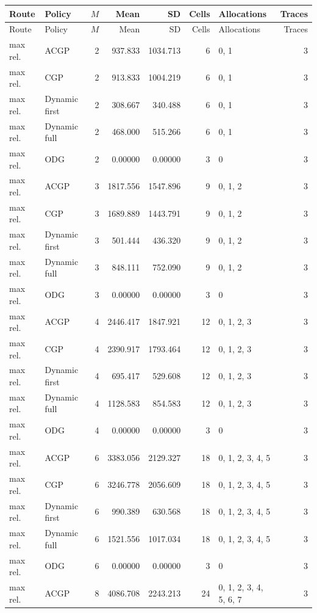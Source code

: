 \documentclass[10pt,a4paper]{article}
\begin{document}
\tiny\setlength{\tabcolsep}{2pt}\begin{longtable}{@{}p{23mm}p{29mm}rrrrp{36mm}r@{}}
\toprule Route & Policy & $M$ & Mean & SD & Cells & Allocations & Traces \\ \midrule\endfirsthead
\toprule Route & Policy & $M$ & Mean & SD & Cells & Allocations & Traces \\ \midrule\endhead
\bottomrule\endfoot
max rel. & ACGP & 2 & 937.833 & 1034.713 & 6 & 0, 1 & 3 \\
max rel. & CGP & 2 & 913.833 & 1004.219 & 6 & 0, 1 & 3 \\
max rel. & Dynamic first & 2 & 308.667 & 340.488 & 6 & 0, 1 & 3 \\
max rel. & Dynamic full & 2 & 468.000 & 515.266 & 6 & 0, 1 & 3 \\
max rel. & ODG & 2 & 0.00000 & 0.00000 & 3 & 0 & 3 \\
max rel. & ACGP & 3 & 1817.556 & 1547.896 & 9 & 0, 1, 2 & 3 \\
max rel. & CGP & 3 & 1689.889 & 1443.791 & 9 & 0, 1, 2 & 3 \\
max rel. & Dynamic first & 3 & 501.444 & 436.320 & 9 & 0, 1, 2 & 3 \\
max rel. & Dynamic full & 3 & 848.111 & 752.090 & 9 & 0, 1, 2 & 3 \\
max rel. & ODG & 3 & 0.00000 & 0.00000 & 3 & 0 & 3 \\
max rel. & ACGP & 4 & 2446.417 & 1847.921 & 12 & 0, 1, 2, 3 & 3 \\
max rel. & CGP & 4 & 2390.917 & 1793.464 & 12 & 0, 1, 2, 3 & 3 \\
max rel. & Dynamic first & 4 & 695.417 & 529.608 & 12 & 0, 1, 2, 3 & 3 \\
max rel. & Dynamic full & 4 & 1128.583 & 854.583 & 12 & 0, 1, 2, 3 & 3 \\
max rel. & ODG & 4 & 0.00000 & 0.00000 & 3 & 0 & 3 \\
max rel. & ACGP & 6 & 3383.056 & 2129.327 & 18 & 0, 1, 2, 3, 4, 5 & 3 \\
max rel. & CGP & 6 & 3246.778 & 2056.609 & 18 & 0, 1, 2, 3, 4, 5 & 3 \\
max rel. & Dynamic first & 6 & 990.389 & 630.568 & 18 & 0, 1, 2, 3, 4, 5 & 3 \\
max rel. & Dynamic full & 6 & 1521.556 & 1017.034 & 18 & 0, 1, 2, 3, 4, 5 & 3 \\
max rel. & ODG & 6 & 0.00000 & 0.00000 & 3 & 0 & 3 \\
max rel. & ACGP & 8 & 4086.708 & 2243.213 & 24 & 0, 1, 2, 3, 4, 5, 6, 7 & 3 \\

\end{longtable}
\end{document}
